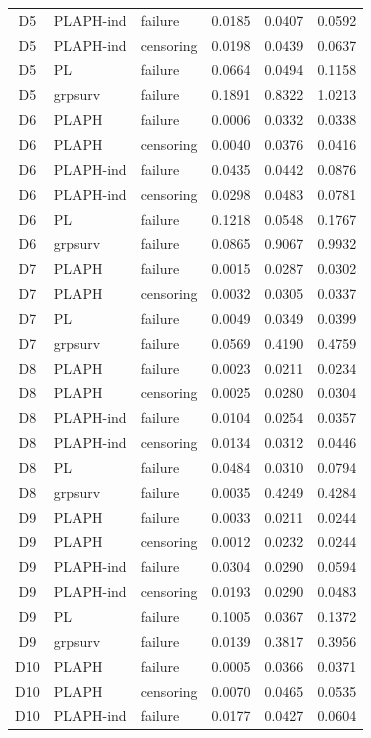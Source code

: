 \begin{longtable}{cllrrr}
D5 & PLAPH-ind & failure & 0.0185 & 0.0407 & 0.0592 \\
D5 & PLAPH-ind & censoring & 0.0198 & 0.0439 & 0.0637 \\
D5 & PL & failure & 0.0664 & 0.0494 & 0.1158 \\
D5 & grpsurv & failure & 0.1891 & 0.8322 & 1.0213 \\
D6 & PLAPH & failure & 0.0006 & 0.0332 & 0.0338 \\
D6 & PLAPH & censoring & 0.0040 & 0.0376 & 0.0416 \\
D6 & PLAPH-ind & failure & 0.0435 & 0.0442 & 0.0876 \\
D6 & PLAPH-ind & censoring & 0.0298 & 0.0483 & 0.0781 \\
D6 & PL & failure & 0.1218 & 0.0548 & 0.1767 \\
D6 & grpsurv & failure & 0.0865 & 0.9067 & 0.9932 \\
D7 & PLAPH & failure & 0.0015 & 0.0287 & 0.0302 \\
D7 & PLAPH & censoring & 0.0032 & 0.0305 & 0.0337 \\
D7 & PL & failure & 0.0049 & 0.0349 & 0.0399 \\
D7 & grpsurv & failure & 0.0569 & 0.4190 & 0.4759 \\
D8 & PLAPH & failure & 0.0023 & 0.0211 & 0.0234 \\
D8 & PLAPH & censoring & 0.0025 & 0.0280 & 0.0304 \\
D8 & PLAPH-ind & failure & 0.0104 & 0.0254 & 0.0357 \\
D8 & PLAPH-ind & censoring & 0.0134 & 0.0312 & 0.0446 \\
D8 & PL & failure & 0.0484 & 0.0310 & 0.0794 \\
D8 & grpsurv & failure & 0.0035 & 0.4249 & 0.4284 \\
D9 & PLAPH & failure & 0.0033 & 0.0211 & 0.0244 \\
D9 & PLAPH & censoring & 0.0012 & 0.0232 & 0.0244 \\
D9 & PLAPH-ind & failure & 0.0304 & 0.0290 & 0.0594 \\
D9 & PLAPH-ind & censoring & 0.0193 & 0.0290 & 0.0483 \\
D9 & PL & failure & 0.1005 & 0.0367 & 0.1372 \\
D9 & grpsurv & failure & 0.0139 & 0.3817 & 0.3956 \\
D10 & PLAPH & failure & 0.0005 & 0.0366 & 0.0371 \\
D10 & PLAPH & censoring & 0.0070 & 0.0465 & 0.0535 \\
D10 & PLAPH-ind & failure & 0.0177 & 0.0427 & 0.0604 \\

\end{longtable}
